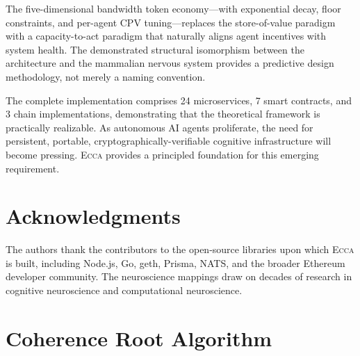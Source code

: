 \documentclass[11pt,twocolumn]{article}
\theoremstyle{definition}
\theoremstyle{plain}
\theoremstyle{remark}
\newcommand{\ecca}{\textsc{Ecca}}
\begin{document}
The five-dimensional bandwidth token economy---with exponential decay, floor constraints, and per-agent CPV tuning---replaces the store-of-value paradigm with a capacity-to-act paradigm that naturally aligns agent incentives with system health. The demonstrated structural isomorphism between the architecture and the mammalian nervous system provides a predictive design methodology, not merely a naming convention.

The complete implementation comprises 24 microservices, 7 smart contracts, and 3 chain implementations, demonstrating that the theoretical framework is practically realizable. As autonomous AI agents proliferate, the need for persistent, portable, cryptographically-verifiable cognitive infrastructure will become pressing. \ecca{} provides a principled foundation for this emerging requirement.


\section*{Acknowledgments}
The authors thank the contributors to the open-source libraries upon which \ecca{} is built, including Node.js, Go, geth, Prisma, NATS, and the broader Ethereum developer community. The neuroscience mappings draw on decades of research in cognitive neuroscience and computational neuroscience.

\balance



\appendix

\section{Coherence Root Algorithm}\label{app:algorithm}
\end{document}
